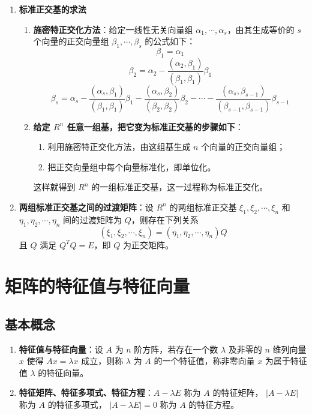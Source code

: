\documentclass[UTF8]{ctexart}
\theoremstyle{mydef}
\begin{document}
\begin{enumerate}
    \item \textbf{标准正交基的求法}
    \begin{enumerate}
        \item \textbf{施密特正交化方法}：给定一线性无关向量组 $\alpha_1, \cdots, \alpha_s$，由其生成等价的 $s$ 个向量的正交向量组 $\beta_1, \cdots, \beta_s$ 的公式如下：
        $$ \beta_1 = \alpha_1 $$
        $$ \beta_2 = \alpha_2 - \frac{(\alpha_2, \beta_1)}{(\beta_1, \beta_1)}\beta_1 $$
        $$ \beta_s = \alpha_s - \frac{(\alpha_s, \beta_1)}{(\beta_1, \beta_1)}\beta_1 - \frac{(\alpha_s, \beta_2)}{(\beta_2, \beta_2)}\beta_2 - \cdots - \frac{(\alpha_s, \beta_{s-1})}{(\beta_{s-1}, \beta_{s-1})}\beta_{s-1} $$
        \item \textbf{给定 $R^n$ 任意一组基，把它变为标准正交基的步骤如下}：
        \begin{enumerate}
            \item 利用施密特正交化方法，由这组基生成 $n$ 个向量的正交向量组；
            \item 把正交向量组中每个向量标准化，即单位化。
        \end{enumerate}
        这样就得到 $R^n$ 的一组标准正交基，这一过程称为标准正交化。
    \end{enumerate}

    \item \textbf{两组标准正交基之间的过渡矩阵}：设 $R^n$ 的两组标准正交基 $\xi_1, \xi_2, \cdots, \xi_n$ 和 $\eta_1, \eta_2, \cdots, \eta_n$ 间的过渡矩阵为 $Q$，则存在下列关系
    $$ (\xi_1, \xi_2, \cdots, \xi_n) = (\eta_1, \eta_2, \cdots, \eta_n) Q $$
    且 $Q$ 满足 $Q^T Q = E$，即 $Q$ 为正交矩阵。
\end{enumerate}

\newpage
\section{矩阵的特征值与特征向量}

\subsection{基本概念}
\begin{enumerate}
    \item \textbf{特征值与特征向量}：设 $A$ 为 $n$ 阶方阵，若存在一个数 $\lambda$ 及非零的 $n$ 维列向量 $x$ 使得 $Ax = \lambda x$ 成立，则称 $\lambda$ 为 $A$ 的一个特征值，称非零向量 $x$ 为属于特征值 $\lambda$ 的特征向量。
    \item \textbf{特征矩阵、特征多项式、特征方程}：$A-\lambda E$ 称为 $A$ 的特征矩阵， $|A-\lambda E|$ 称为 $A$ 的特征多项式， $|A-\lambda E|=0$ 称为 $A$ 的特征方程。
\end{enumerate}
\end{document}

